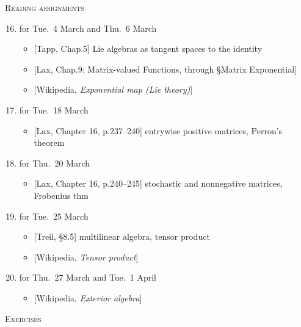 \documentclass[11pt]{article}
\newcommand\total[2]{\marginpar{\colorbox{yellow}{\huge #1/#2}}}
\newcommand\0{\mathbf{0}}
\newcommand\<{\langle}
\renewcommand\>{\rangle}
\begin{document}
\noindent
\textsc{Reading assignments}\total{}{48}%
\begin{enumerate}[itemsep=-1ex]\setcounter{enumi}{15}
\item[16--17.]\addtocounter{enumi}{2}%
for Tue.~4 March and Thu.~6 March
  \begin{itemize}
  \item{}%
  [Tapp, Chap.5] Lie algebras as tangent spaces to the identity
  \item{}%
  [Lax, Chap.9: Matrix-valued Functions, through \S Matrix Exponential]
  \item{}%
  [Wikipedia, \emph{Exponential map (Lie theory)}]
  \end{itemize}

\item%
for Tue.~18 March
  \begin{itemize}
  \item{}%
  [Lax, Chapter 16, p.237--240] entrywise positive matrices, Perron's theorem
  \end{itemize}

\item%
for Thu.~20 March
  \begin{itemize}
  \item{}%
  [Lax, Chapter 16, p.240--245] stochastic and nonnegative matrices,
  Frobenius thm
  \end{itemize}

\item%
for Tue.~25 March
  \begin{itemize}
  \item{}%
  [Treil, \S 8.5] multilinear algebra, tensor product
  \item{}%
  [Wikipedia, \emph{Tensor product}]
  \end{itemize}

\item[21--22.]\addtocounter{enumi}{2}%
for Thu.~27 March and Tue.~1 April
  \begin{itemize}
  \item{}%
  [Wikipedia, \emph{Exterior algebra}]
  \end{itemize}
\end{enumerate}

\noindent
\textsc{Exercises}%
\end{document}
